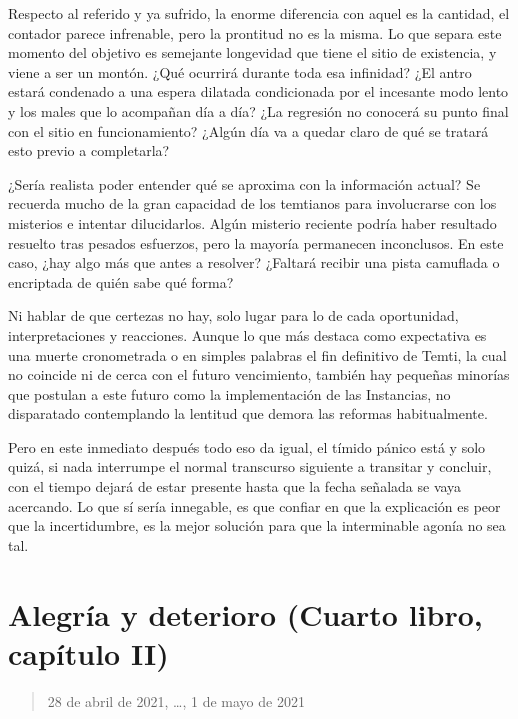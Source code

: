 \documentclass[
]{book}
\begin{document}
Respecto al referido y ya sufrido, la enorme diferencia con aquel es la cantidad, el contador parece infrenable, pero la prontitud no es la misma. Lo que separa este momento del objetivo es semejante longevidad que tiene el sitio de existencia, y viene a ser un montón. ¿Qué ocurrirá durante toda esa infinidad? ¿El antro estará condenado a una espera dilatada condicionada por el incesante modo lento y los males que lo acompañan día a día? ¿La regresión no conocerá su punto final con el sitio en funcionamiento? ¿Algún día va a quedar claro de qué se tratará esto previo a completarla?

¿Sería realista poder entender qué se aproxima con la información actual? Se recuerda mucho de la gran capacidad de los temtianos para involucrarse con los misterios e intentar dilucidarlos. Algún misterio reciente podría haber resultado resuelto tras pesados esfuerzos, pero la mayoría permanecen inconclusos. En este caso, ¿hay algo más que antes a resolver? ¿Faltará recibir una pista camuflada o encriptada de quién sabe qué forma?

Ni hablar de que certezas no hay, solo lugar para lo de cada oportunidad, interpretaciones y reacciones. Aunque lo que más destaca como expectativa es una muerte cronometrada o en simples palabras el fin definitivo de Temti, la cual no coincide ni de cerca con el futuro vencimiento, también hay pequeñas minorías que postulan a este futuro como la implementación de las Instancias, no disparatado contemplando la lentitud que demora las reformas habitualmente.

Pero en este inmediato después todo eso da igual, el tímido pánico está y solo quizá, si nada interrumpe el normal transcurso siguiente a transitar y concluir, con el tiempo dejará de estar presente hasta que la fecha señalada se vaya acercando. Lo que sí sería innegable, es que confiar en que la explicación es peor que la incertidumbre, es la mejor solución para que la interminable agonía no sea tal.

\hypertarget{alegruxeda-y-deterioro-cuarto-libro-capuxedtulo-ii}{%
\section{Alegría y deterioro (Cuarto libro, capítulo II)}\label{alegruxeda-y-deterioro-cuarto-libro-capuxedtulo-ii}}

\begin{quote}
28 de abril de 2021, \ldots, 1 de mayo de 2021
\end{quote}
\end{document}
